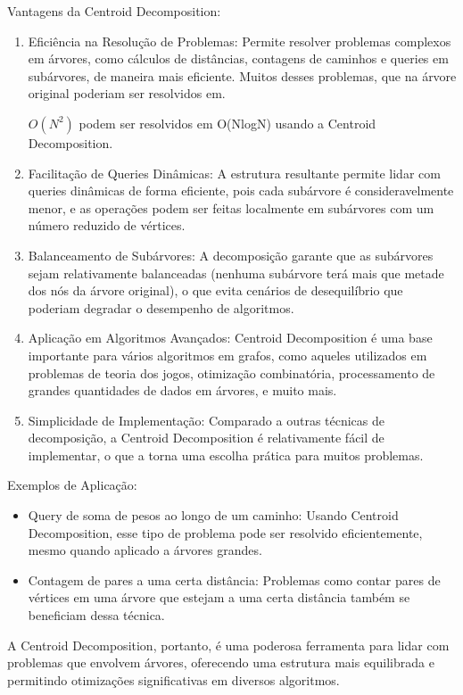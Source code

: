 Vantagens da Centroid Decomposition:
\begin{enumerate}
    \item Eficiência na Resolução de Problemas: Permite resolver problemas complexos em árvores, como cálculos de distâncias, contagens de caminhos e queries em subárvores, de maneira mais eficiente. Muitos desses problemas, que na árvore original poderiam ser resolvidos em.
    
    $O(N^2)$ podem ser resolvidos em O(NlogN) usando a Centroid Decomposition.
    \item Facilitação de Queries Dinâmicas: A estrutura resultante permite lidar com queries dinâmicas de forma eficiente, pois cada subárvore é consideravelmente menor, e as operações podem ser feitas localmente em subárvores com um número reduzido de vértices.
    \item Balanceamento de Subárvores: A decomposição garante que as subárvores sejam relativamente balanceadas (nenhuma subárvore terá mais que metade dos nós da árvore original), o que evita cenários de desequilíbrio que poderiam degradar o desempenho de algoritmos.
    \item Aplicação em Algoritmos Avançados: Centroid Decomposition é uma base importante para vários algoritmos em grafos, como aqueles utilizados em problemas de teoria dos jogos, otimização combinatória, processamento de grandes quantidades de dados em árvores, e muito mais.
    \item Simplicidade de Implementação: Comparado a outras técnicas de decomposição, a Centroid Decomposition é relativamente fácil de implementar, o que a torna uma escolha prática para muitos problemas.
\end{enumerate}

Exemplos de Aplicação:
\begin{itemize}
    \item Query de soma de pesos ao longo de um caminho: Usando Centroid Decomposition, esse tipo de problema pode ser resolvido eficientemente, mesmo quando aplicado a árvores grandes.
    \item Contagem de pares a uma certa distância: Problemas como contar pares de vértices em uma árvore que estejam a uma certa distância também se beneficiam dessa técnica.
\end{itemize}

A Centroid Decomposition, portanto, é uma poderosa ferramenta para lidar com problemas que envolvem árvores, oferecendo uma estrutura mais equilibrada e permitindo otimizações significativas em diversos algoritmos.